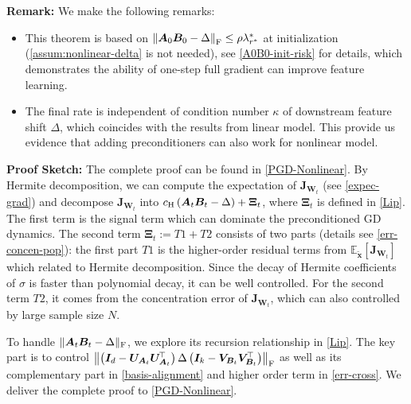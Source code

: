 \noindent
{\bf Remark:} We make the following remarks:
\begin{itemize}
    \item This theorem is based on $\left\|\bm A_0 \bm B_0 - \Delta\right\|_{\rm F} \leq \rho\lambda^*_{r^*}$ at initialization (\cref{assum:nonlinear-delta} is not needed), see \cref{A0B0-init-risk} for details, which demonstrates the ability of one-step full gradient can improve feature learning.
    \item The final rate is independent of condition number $\kappa$ of downstream feature shift $\Delta$, which coincides with the results from linear model. This provide us evidence that adding preconditioners can also work for nonlinear model.
\end{itemize}

\noindent 
{\bf Proof Sketch:} The complete proof can be found in \cref{PGD-Nonlinear}. By Hermite decomposition, we can compute the expectation of $\bm J_{\bm W_t}$ (see \cref{expec-grad}) and decompose $\bm J_{\bm W_t}$ into $c_{\rm H}\left(\bm A_{t}\bm B_{t} - \Delta\right) + \bm \Xi_t$,
where $\bm \Xi_t$ is defined in \cref{Lip}. The first term is the signal term which can dominate the preconditioned GD dynamics. The second term $\bm \Xi_t := T1 +T2$ consists of two parts (details see \cref{err-concen-pop}): the first part $T1$ is the higher-order residual terms from $\mathbb{E}_{\widetilde{\bm x}}\left[\bm J_{\bm W_t}\right]$ which related to Hermite decomposition. Since the decay of Hermite coefficients of $\sigma$ is faster than polynomial decay, it can be well controlled. For the second term $T2$, it comes from the concentration error of $\bm J_{\bm W_t}$, which can also controlled by large sample size $N$.

To handle $\| \bm A_t \bm B_t - \Delta \|_{\rm F}$, we explore its recursion relationship in \cref{Lip}. The key part is to control $\left\|\left(\bm I_d - \bm U_{\bm A_t} \bm U_{\bm A_t}^{\!\top}\right)\Delta\left(\bm I_k - \bm V_{\bm B_t} \bm V_{\bm B_t}^{\!\top}\right)\right\|_{\rm F}$ as well as its complementary part in \cref{basis-alignment} and higher order term in \cref{err-cross}.  We deliver the complete proof to \cref{PGD-Nonlinear}. 

